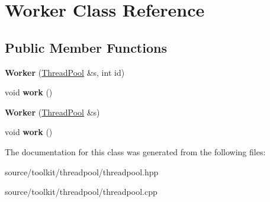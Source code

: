 \hypertarget{classWorker}{}\section{Worker Class Reference}
\label{classWorker}
\subsection*{Public Member Functions}
\begin{DoxyCompactItemize}
\item 
\mbox{\label{classWorker_a338cfdd6e6aa49e0e32272408418f24a}} 
{\bfseries Worker} (\hyperlink{classThreadPool}{Thread\+Pool} \&s, int id)
\item 
\mbox{\label{classWorker_a296bc6b6cea5648d891561a01d2c3f98}} 
void {\bfseries work} ()
\item 
\mbox{\label{classWorker_aa7a2d1466d9daf7555f108a9a16d29ec}} 
{\bfseries Worker} (\hyperlink{classThreadPool}{Thread\+Pool} \&s)
\item 
\mbox{\label{classWorker_a296bc6b6cea5648d891561a01d2c3f98}} 
void {\bfseries work} ()
\end{DoxyCompactItemize}


The documentation for this class was generated from the following files\+:\begin{DoxyCompactItemize}
\item 
source/toolkit/threadpool/threadpool.\+hpp\item 
source/toolkit/threadpool/threadpool.\+cpp\end{DoxyCompactItemize}
